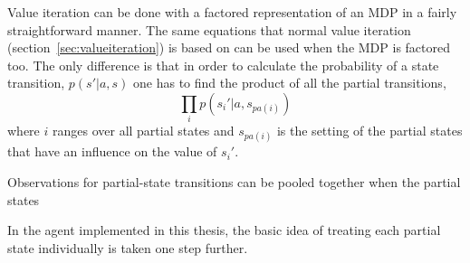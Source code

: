 Value iteration can be done with a factored representation of an MDP in a fairly straightforward manner. The same equations that normal value iteration (section~\ref{sec:valueiteration}) is based on can be used when the MDP is factored too. The only difference is that in order to calculate the probability of a state transition, $p(s'| a, s)$ one has to find the product of all the partial transitions,
$$\prod\limits _{i} p(s_i' | a, s_{pa(i)})$$
where $i$ ranges over all partial states and $s_{pa(i)}$ is the setting of the partial states that have an influence on the value of $s_i'$. 

Observations for partial-state transitions can be pooled together when the partial states 

In the agent implemented in this thesis, the basic idea of treating each partial state individually is taken one step further.
